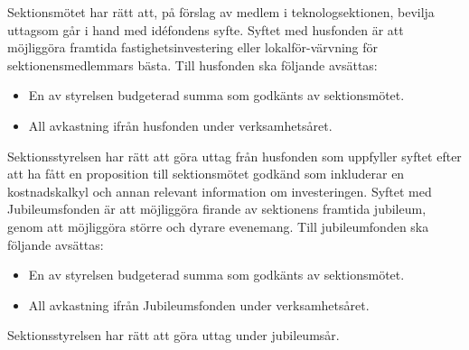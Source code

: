 \documentclass[a4paper]{dteklag}
\begin{document}
\para Sektionsmötet har rätt att, på förslag av medlem i teknologsektionen, bevilja uttagsom går i hand med idéfondens syfte.
\para[Husfonden] Syftet med husfonden är att möjliggöra framtida fastighetsinvestering eller lokalför-värvning för sektionensmedlemmars bästa.
\para Till husfonden ska följande avsättas:
\begin{itemize}
  \item En av styrelsen budgeterad summa som godkänts av sektionsmötet.
  \item All avkastning ifrån husfonden under verksamhetsåret.
\end{itemize}
\para Sektionsstyrelsen har rätt att göra uttag från husfonden som uppfyller syftet efter att ha fått en proposition till sektionsmötet godkänd som inkluderar en kostnadskalkyl och annan relevant information om investeringen.
\para[Jubileumsfonden] Syftet med Jubileumsfonden är att möjliggöra firande av sektionens framtida jubileum, genom att möjliggöra större och dyrare evenemang.
\para Till jubileumfonden ska följande avsättas:
\begin{itemize}
  \item En av styrelsen budgeterad summa som godkänts av sektionsmötet.
  \item All avkastning ifrån Jubileumsfonden under verksamhetsåret.
\end{itemize}
\para Sektionsstyrelsen har rätt att göra uttag under jubileumsår.
\end{document}
